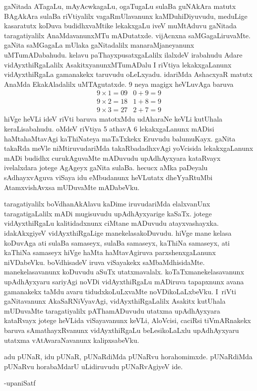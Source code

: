 gaNitada ATagaLu, mAyAcwkagaLu, ogaTugaLu sulaBa guNAkAra matutx BAgAkAra sulaBa riVtiyalilx vagaRmUlavanunx kaMDuhiDiyuvudu, meduLige kasaratutx koDuva budidhxvaMtike lekakxgaLu iveV muMtAduvu gaNitada taragatiyalilx AnaMdavanunxMTu mADutatxde. vijAcnxna saMGagaLiruvaMte. gaNita saMGagaLa mUlaka gaNitadalilx manaraMjaneyanunx uMTumADabahudu. kelavu paThayxpusatxgaLalilx ilalxdeV irabahudu Adare vidAyxthiRgaLalilx AsakitxyanunxMTumADalu I riVtiya lekakxgaLanunx vidAyxthiRgaLa gamanakekx taruvudu oLeLxyadu. idariMda AshacxyaR matutx AnaMda EkakAladalilx uMTAgutatxde. {\rm 9} neya magigx heVLuvAga baruva 
$$
\begin{matrix}
9\times 1=09 & 0+9 = 9\\
9\times 2=18 & 1+8 = 9\\
9\times 3=27 & 2+7 = 9
\end{matrix}
$$ hiVge heVLi ideV riVti baruva matotxMdu udAharaNe keVLi kutUhala keraLisabahudu. oMdeV riVtiya {\rm 5} athavA {\rm 6} lekakxgaLanunx mADisi haMtahaMtavAgi kaThiNateya maTaTxkekx Eruvudu balumuKayx. gaNita takaRda meVle niMtiruvudariMda takaRbadadhxvAgi yoVcisida lekakxgaLanunx mADi budidhx curukAguvaMte mADuvudu upAdhAyxyara kataRvayx ivelalxdara jotege AgAgeyx gaNita sulaBa. hecucx aMka paDeyalu sAdhayxvAguva viSaya idu eMbudanunx heVLutatx dheYyaRtuMbi AtamxvishAvxsa mUDuvaMte mADabeVku.

taragatiyalilx boVdhanAkAlavu kaDime iruvudariMda elalxvanUnx taragatigaLalilx mADi mugisuvudu upAdhAyxyarige kaSaTx. jotege vidAyxthiRgaLu kalitidadxnunx ciMtane mADuvudu atayxvashayxka. idakAkxgiyeV vidAyxthiRgaLige manekelasakoDuvudu. hiVge mane kelasa koDuvAga ati sulaBa samaseyx, sulaBa samaseyx, kaThiNa samaseyx, ati kaThiNa samaseyx hiVge haMta haMtavAgiruva parxshenxgaLanunx niVDabeVku. boVdhisadeV iruva viSayakekx saMbaMdhisidaMte.
manekelasavanunx koDuvudu aSuTx utatxmavalalx. koTaTxmanekelasavanunx upAdhAyxyaru sariyAgi noVDi vidAyxthiRgaLu mADiruva tapapxnunx avana gamanakekx taMdu avaru tidudxkoLuLxvaMte noVDikoLaLxbeVku. I~riVti gaNitavanunx AkaSaRNiVyavAgi, vidAyxthiRgaLalilx Asakitx kutUhala mUDuvaMte taragatiyalilx pAThamADuvudu utatxma upAdhAyxyara kataRvayx jotege heVLida viSayavanunx keVLi, AloVcisi, caciRsi tiVmARnakekx baruva sAmathayxRvanunx vidAyxthiRgaLu beLesikoLaLxlu upAdhAyxyaru utatxma vAtAvaraNavanunx kalipxsabeVku.

adu pUNaR, idu pUNaR, pUNaRdiMda pUNaRvu horahomimxde. pUNaR\-diMda pUNaRvu horabaMdarU uLidiruvudu pUNaRvAgiyeV ide.

\begin{flushright}
-upaniSatf
\end{flushright}

